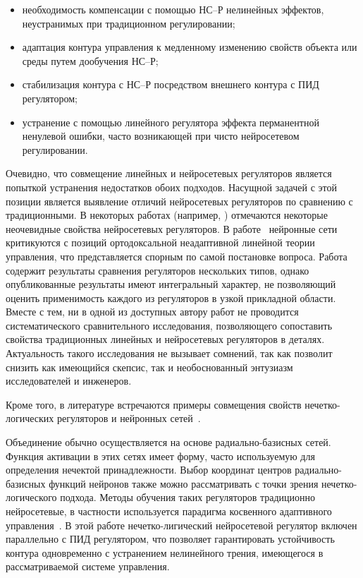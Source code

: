\begin{itemize}

\item
необходимость компенсации с помощью НС--Р нелинейных эффектов,
неустранимых при традиционном регулировании;

\item
адаптация контура управления к медленному изменению свойств объекта
или среды путем дообучения НС--Р;

\item
стабилизация контура с НС--Р посредством внешнего контура с ПИД
регулятором;

\item
устранение с помощью линейного регулятора эффекта перманентной
ненулевой ошибки, часто возникающей при чисто нейросетевом
регулировании.

\end{itemize}

Очевидно, что совмещение линейных и нейросетевых регуляторов является
попыткой устранения недостатков обоих подходов.  Насущной задачей с
этой позиции является выявление отличий нейросетевых регуляторов по
сравнению с традиционными.  В некоторых работах (например,
\cite{chenmills97}) отмечаются некоторые неочевидные свойства
нейросетевых регуляторов.  В работе~\cite{warwick96} нейронные сети
критикуются с позиций ортодоксальной неадаптивной линейной теории
управления, что представляется спорным по самой постановке вопроса.
Работа~\cite{khomyu96} содержит результаты сравнения регуляторов
нескольких типов, однако опубликованные результаты имеют интегральный
характер, не позволяющий оценить применимость каждого из регуляторов в
узкой прикладной области.  Вместе с тем, ни в одной из доступных
автору работ не проводится систематического сравнительного
исследования, позволяющего сопоставить свойства традиционных линейных
и нейросетевых регуляторов в деталях.  Актуальность такого
исследования не вызывает сомнений, так как позволит снизить как
имеющийся скепсис, так и необоснованный энтузиазм исследователей и
инженеров.

Кроме того, в литературе встречаются примеры совмещения свойств
нечетко-{логичес\-ких} регуляторов и нейронных
сетей~\cite{sigom00,linwaihong01}.

Объединение обычно осуществляется на основе радиально-базисных сетей.
Функция активации в этих сетях имеет форму, часто используемую для
определения нечектой принадлежности.  Выбор координат центров
радиально-базисных функций нейронов также можно рассматривать с точки
зрения нечетко-логического подхода.  Методы обучения таких регуляторов
традиционно нейросетевые, в частности используется парадигма
косвенного адаптивного управления~\cite{wailinlin00}.  В этой работе
нечетко-лигический нейросетевой регулятор включен параллельно с ПИД
регулятором, что позволяет гарантировать устойчивость контура
одновременно с устранением нелинейного трения, имеющегося в
рассматриваемой системе управления.

